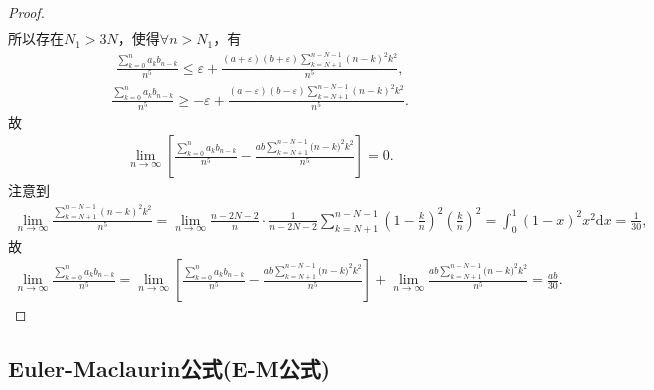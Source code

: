 \documentclass[../../main.tex]{subfiles}%
\begin{document}
\begin{proof}
\begin{align*}
\end{align*}
所以存在$N_1>3N$，使得$\forall n>N_1$，有
\begin{align*}
\frac{\sum\limits_{k=0}^n a_kb_{n-k}}{n^5}\leqslant \varepsilon +\frac{(a+\varepsilon)(b+\varepsilon) \sum\limits_{k=N+1}^{n-N-1} (n-k)^2k^2}{n^5},
\end{align*}
\begin{align*}
\frac{\sum\limits_{k=0}^n a_kb_{n-k}}{n^5}\geqslant -\varepsilon +\frac{(a-\varepsilon)(b-\varepsilon) \sum\limits_{k=N+1}^{n-N-1} (n-k)^2k^2}{n^5}.
\end{align*}
故
\begin{align*}
\lim_{n\rightarrow \infty} \left[ \frac{\sum\limits_{k=0}^n{a_kb_{n-k}}}{n^5}-\frac{ab\sum\limits_{k=N+1}^{n-N-1}{(n}-k)^2k^2}{n^5} \right] =0.
\end{align*}
注意到
\begin{align*}
\lim\limits_{n\rightarrow \infty}\frac{\sum\limits_{k=N+1}^{n-N-1} (n-k)^2k^2}{n^5}=\lim\limits_{n\rightarrow \infty}\frac{n-2N-2}{n}\cdot \frac{1}{n-2N-2}\sum\limits_{k=N+1}^{n-N-1} \left(1-\frac{k}{n}\right)^2\left( \frac{k}{n} \right)^2
=\int_0^1 (1-x)^2x^2\mathrm{d}x=\frac{1}{30},
\end{align*}
故
\begin{align*}
\lim_{n\rightarrow \infty} \frac{\sum\limits_{k=0}^n{a_kb_{n-k}}}{n^5}=\lim_{n\rightarrow \infty} \left[ \frac{\sum\limits_{k=0}^n{a_kb_{n-k}}}{n^5}-\frac{ab\sum\limits_{k=N+1}^{n-N-1}{(n}-k)^2k^2}{n^5} \right] +\lim_{n\rightarrow \infty} \frac{ab\sum\limits_{k=N+1}^{n-N-1}{(n}-k)^2k^2}{n^5}=\frac{ab}{30}.
\end{align*}
\end{proof}



\subsection{Euler-Maclaurin公式(E-M公式)}
\end{document}
